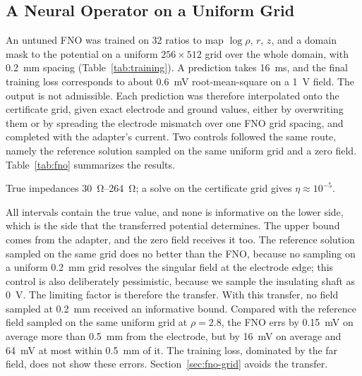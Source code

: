 \documentclass[11pt]{article}
\begin{document}
\subsection{A Neural Operator on a Uniform Grid}\label{sec:fno-uniform}
An untuned FNO \cite{li2021} was trained on 32 ratios to map $\log\rho$, $r$, $z$,
and a domain mask to the potential on a uniform $256\times512$ grid over the whole
domain, with \SI{0.2}{mm} spacing (Table~\ref{tab:training}). A prediction takes
\SI{16}{ms}, and the final training loss corresponds to about \SI{0.6}{mV}
root-mean-square on a \SI{1}{V} field. The output is not admissible. Each prediction
was therefore interpolated onto the certificate grid, given exact electrode and
ground values, either by overwriting them or by spreading the electrode mismatch
over one FNO grid spacing, and completed with the adapter's current. Two controls
followed the same route, namely the reference solution sampled on the same uniform
grid and a zero field. Table~\ref{tab:fno} summarizes the results.

\begin{table}[t]
\centering
\caption{A Uniform-Grid Output, Certified After the Fact (12 Test Ratios)}\label{tab:fno}
\small
{}
\par\vspace{2pt}\footnotesize\raggedright True impedances \SIrange{30}{264}{\ohm}; a solve on the certificate grid gives $\eta\approx10^{-5}$.
\end{table}

All intervals contain the true value, and none is informative on the lower side,
which is the side that the transferred potential determines. The upper bound comes from the adapter, and the zero field
receives it too. The reference solution sampled on the same grid does no better than
the FNO, because no sampling on a uniform \SI{0.2}{mm} grid resolves the singular
field at the electrode edge; this control is also deliberately pessimistic, because
we sample the insulating shaft as \SI{0}{V}. The limiting factor is therefore the
transfer. With this
transfer, no field sampled at \SI{0.2}{mm} received an informative bound. Compared
with the reference field sampled on the same uniform grid at $\rho=2.8$, the FNO errs by
\SI{0.15}{mV} on average more than \SI{0.5}{mm} from the electrode, but by
\SI{16}{mV} on average and \SI{64}{mV} at most within \SI{0.5}{mm} of it. The
training loss, dominated by the far field, does not show these errors. Section~\ref{sec:fno-grid} avoids the transfer.
\end{document}
